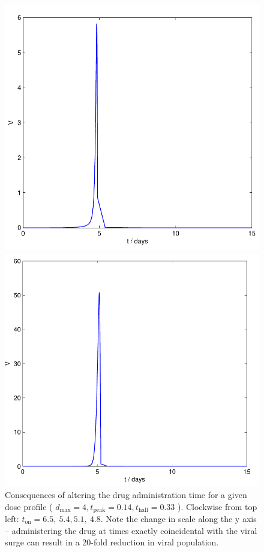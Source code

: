 \documentclass[a4paper, 12pt]{report}
\begin{document}
\begin{figure}[h!]
\begin{minipage}{0.5\textwidth}
\includegraphics[height = 0.317\textheight]{drug_t0_4p8_scissored} %
\end{minipage}
\begin{minipage}{0.5\textwidth}
\includegraphics[height = 0.302\textheight]{drug_t0_5p1_scissored} %
\end{minipage}
\caption{Consequences of altering the drug administration time for a given dose profile ( $d_{\textrm{max}} = 4, t_{\textrm{peak}} = 0.14, t_{\textrm{half}} = 0.33$ ). Clockwise from top left: $t_{\textrm{on}} = 6.5,~5.4,5.1,~4.8.$ Note the change in scale along the y axis -- administering the drug at times exactly coincidental with the viral surge can result in a 20-fold reduction in viral population.}
\label{fig:timesweep}
\end{figure}
\end{document}
